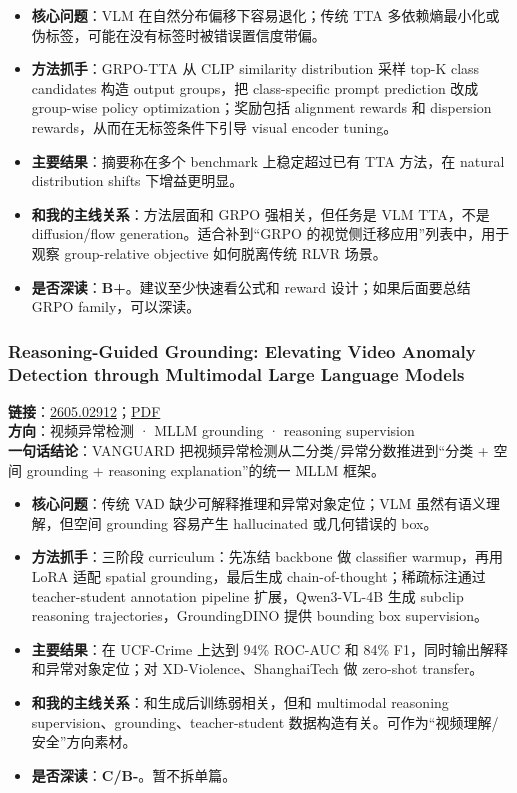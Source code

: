 \begin{itemize}[leftmargin=1.5em]
  \item \textbf{核心问题}：VLM 在自然分布偏移下容易退化；传统 TTA 多依赖熵最小化或伪标签，可能在没有标签时被错误置信度带偏。
  \item \textbf{方法抓手}：GRPO-TTA 从 CLIP similarity distribution 采样 top-K class candidates 构造 output groups，把 class-specific prompt prediction 改成 group-wise policy optimization；奖励包括 alignment rewards 和 dispersion rewards，从而在无标签条件下引导 visual encoder tuning。
  \item \textbf{主要结果}：摘要称在多个 benchmark 上稳定超过已有 TTA 方法，在 natural distribution shifts 下增益更明显。
  \item \textbf{和我的主线关系}：方法层面和 GRPO 强相关，但任务是 VLM TTA，不是 diffusion/flow generation。适合补到“GRPO 的视觉侧迁移应用”列表中，用于观察 group-relative objective 如何脱离传统 RLVR 场景。
  \item \textbf{是否深读}：\textbf{B+}。建议至少快速看公式和 reward 设计；如果后面要总结 GRPO family，可以深读。
\end{itemize}

\subsubsection{Reasoning-Guided Grounding: Elevating Video Anomaly Detection through Multimodal Large Language Models}

\textbf{链接}：\href{https://arxiv.org/abs/2605.02912}{2605.02912}；\href{https://arxiv.org/pdf/2605.02912}{PDF}\\
\textbf{方向}：视频异常检测 · MLLM grounding · reasoning supervision\\
\textbf{一句话结论}：VANGUARD 把视频异常检测从二分类/异常分数推进到“分类 + 空间 grounding + reasoning explanation”的统一 MLLM 框架。

\begin{itemize}[leftmargin=1.5em]
  \item \textbf{核心问题}：传统 VAD 缺少可解释推理和异常对象定位；VLM 虽然有语义理解，但空间 grounding 容易产生 hallucinated 或几何错误的 box。
  \item \textbf{方法抓手}：三阶段 curriculum：先冻结 backbone 做 classifier warmup，再用 LoRA 适配 spatial grounding，最后生成 chain-of-thought；稀疏标注通过 teacher-student annotation pipeline 扩展，Qwen3-VL-4B 生成 subclip reasoning trajectories，GroundingDINO 提供 bounding box supervision。
  \item \textbf{主要结果}：在 UCF-Crime 上达到 94\% ROC-AUC 和 84\% F1，同时输出解释和异常对象定位；对 XD-Violence、ShanghaiTech 做 zero-shot transfer。
  \item \textbf{和我的主线关系}：和生成后训练弱相关，但和 multimodal reasoning supervision、grounding、teacher-student 数据构造有关。可作为“视频理解/安全”方向素材。
  \item \textbf{是否深读}：\textbf{C/B-}。暂不拆单篇。
\end{itemize}

